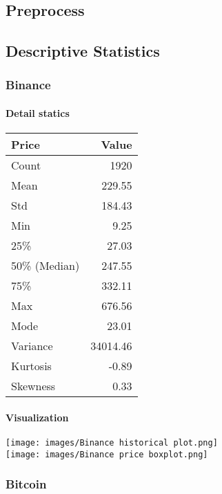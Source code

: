 \documentclass{ieeeojies}
\begin{document}
\subsection{Preprocess}
\subsection{Descriptive Statistics}
\subsubsection{Binance}
\paragraph{Detail statics}
\begin{center}
\begin{tabular}{|l|r|}
\hline
\textbf{Price} & \textbf{Value} \\
\hline
Count & 1920 \\
\hline
Mean & 229.55 \\
\hline
Std & 184.43 \\
\hline
Min & 9.25 \\
\hline
25\% & 27.03 \\
\hline
50\% (Median) & 247.55 \\
\hline
75\% & 332.11 \\
\hline
Max & 676.56 \\
\hline
Mode & 23.01 \\
\hline
Variance & 34014.46 \\
\hline
Kurtosis & -0.89 \\
\hline
Skewness & 0.33 \\
\hline
\end{tabular}
\end{center}
\paragraph{Visualization}
\texttt{[image: images/Binance historical plot.png]}\\
\texttt{[image: images/Binance price boxplot.png]}
\subsubsection{Bitcoin}
\end{document}
